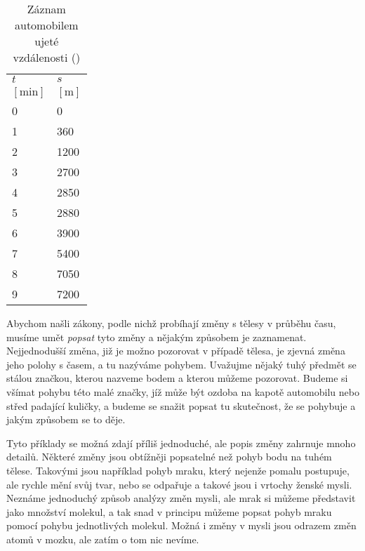     \begin{table}[ht!]      %
      \centering
      \renewcommand{\arraystretch}{1}
      \begin{tabular}{>{\centering\arraybackslash}p{3em}|>{\centering\arraybackslash}p{3em}}
        \hline \(t\)     & \(s\)          \\
        \([\text{min}]\) & \([\text{m}]\) \\
        \hline    \num{0} & \num{0}        \\
                  \num{1} & \num{360}      \\
                  \num{2} & \num{1200}     \\
                  \num{3} & \num{2700}     \\
                  \num{4} & \num{2850}     \\
                  \num{5} & \num{2880}     \\
                  \num{6} & \num{3900}     \\
                  \num{7} & \num{5400}     \\
                  \num{8} & \num{7050}     \\
                  \num{9} & \num{7200}     \\
        \hline 
      \end{tabular}
      \caption{Záznam automobilem ujeté vzdálenosti (\cite[s.~109]{Feynman01})}
      \label{fyz:tab002}
    \end{table}
    Abychom našli zákony, podle nichž probíhají změny s tělesy v průběhu času, musíme umět 
    \emph{popsat} tyto změny a nějakým způsobem je zaznamenat. Nejjednodušší změna, již je možno 
    pozorovat v případě tělesa, je zjevná změna jeho polohy s časem, a tu nazýváme pohybem. 
    Uvažujme nějaký tuhý předmět se stálou značkou, kterou nazveme bodem a kterou můžeme pozorovat. 
    Budeme si všímat pohybu této malé značky, jíž může být ozdoba na kapotě automobilu nebo střed 
    padající kuličky, a budeme se snažit popsat tu skutečnost, že se pohybuje a jakým způsobem se 
    to děje.

    Tyto příklady se možná zdají příliš jednoduché, ale popis změny zahrnuje mnoho detailů. Některé 
    změny jsou obtížněji popsatelné než pohyb bodu na tuhém tělese. Takovými jsou například pohyb 
    mraku, který nejenže pomalu postupuje, ale rychle mění svůj tvar, nebo se odpařuje a takové 
    jsou i vrtochy ženské mysli. Neznáme jednoduchý způsob analýzy změn mysli, ale mrak si můžeme 
    představit jako množství molekul, a tak snad v principu můžeme popsat pohyb mraku pomocí pohybu 
    jednotlivých molekul. Možná i změny v mysli jsou odrazem změn atomů v mozku, ale zatím o tom 
    nic nevíme.

